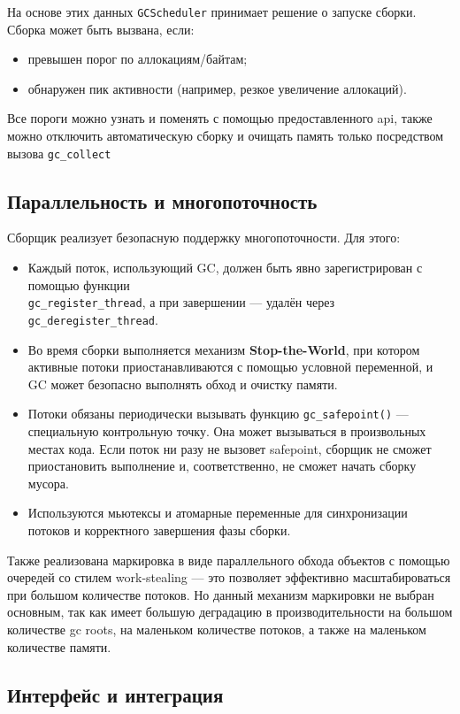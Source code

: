 На основе этих данных \texttt{GCScheduler} принимает решение о запуске сборки. Сборка может быть вызвана, если:
\begin{itemize}
    \item превышен порог по аллокациям/байтам;
    \item обнаружен пик активности (например, резкое увеличение аллокаций).
\end{itemize}
Все пороги можно узнать и поменять с помощью предоставленного api, также можно отключить автоматическую сборку и очищать память только посредством вызова \texttt{gc\_collect}
\subsection{Параллельность и многопоточность}

Сборщик реализует безопасную поддержку многопоточности. Для этого:
\begin{itemize}
    \item Каждый поток, использующий GC, должен быть явно зарегистрирован с помощью функции \\\texttt{gc\_register\_thread}, а при завершении — удалён через \texttt{gc\_deregister\_thread}.
    \item Во время сборки выполняется механизм \textbf{Stop-the-World}, при котором активные потоки приостанавливаются с помощью условной переменной, и GC может безопасно выполнять обход и очистку памяти.
    \item Потоки обязаны периодически вызывать функцию \texttt{gc\_safepoint()} — специальную контрольную точку. Она может вызываться в произвольных местах кода. Если поток ни разу не вызовет safepoint, сборщик не сможет приостановить выполнение и, соответственно, не сможет начать сборку мусора.
    \item Используются мьютексы и атомарные переменные для синхронизации потоков и корректного завершения фазы сборки.
\end{itemize}

Также реализована маркировка в виде параллельного обхода объектов с помощью очередей со стилем work-stealing — это позволяет эффективно масштабироваться при большом количестве потоков. Но данный механизм маркировки не выбран основным, так как имеет большую деградацию в производительности на большом количестве gc roots, на маленьком количестве потоков, а также на маленьком количестве памяти.

\subsection{Интерфейс и интеграция}

